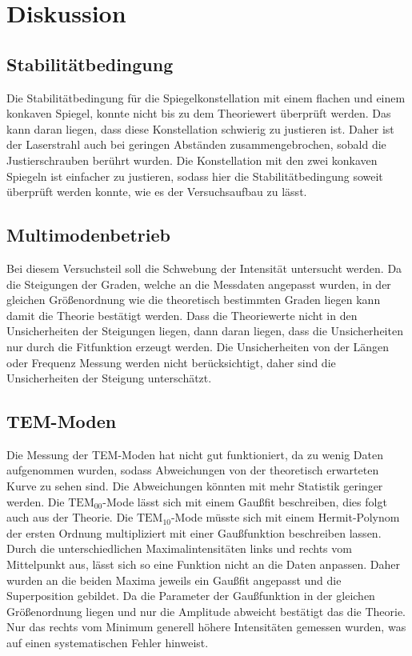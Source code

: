 \section{Diskussion}
\label{sec:Diskussion}
\subsection{Stabilitätbedingung}
Die Stabilitätbedingung für die Spiegelkonstellation mit einem flachen und einem konkaven Spiegel, konnte 
nicht bis zu dem Theoriewert überprüft werden. Das kann daran liegen, dass diese Konstellation schwierig zu 
justieren ist. Daher ist der Laserstrahl auch bei geringen Abständen zusammengebrochen, sobald die Justierschrauben 
berührt wurden. Die Konstellation mit den zwei konkaven Spiegeln ist einfacher zu justieren, sodass hier die Stabilitätbedingung
soweit überprüft werden konnte, wie es der Versuchsaufbau zu lässt.
\subsection{Multimodenbetrieb}
Bei diesem Versuchsteil soll die Schwebung der Intensität untersucht werden. Da die Steigungen der Graden, welche an die 
Messdaten angepasst wurden, in der gleichen Größenordnung wie die theoretisch bestimmten Graden liegen kann damit die 
Theorie bestätigt werden. Dass die Theoriewerte nicht in den Unsicherheiten der Steigungen liegen, dann daran liegen, dass
die Unsicherheiten nur durch die Fitfunktion erzeugt werden. Die Unsicherheiten von der Längen oder Frequenz Messung werden 
nicht berücksichtigt, daher sind die Unsicherheiten der Steigung unterschätzt.
\subsection{TEM-Moden}
Die Messung der TEM-Moden hat nicht gut funktioniert, da zu wenig Daten aufgenommen wurden, sodass Abweichungen 
von der theoretisch erwarteten Kurve zu sehen sind. Die Abweichungen könnten mit mehr Statistik geringer werden. 
Die $\text{TEM}_{00}$-Mode lässt sich mit einem Gaußfit beschreiben, dies folgt auch aus der Theorie. Die 
$\text{TEM}_{10}$-Mode müsste sich mit einem Hermit-Polynom der ersten Ordnung multipliziert mit einer Gaußfunktion 
beschreiben lassen. Durch die unterschiedlichen Maximalintensitäten links und rechts vom Mittelpunkt aus, lässt sich 
so eine Funktion nicht an die Daten anpassen. Daher wurden an die beiden Maxima jeweils ein Gaußfit angepasst und die 
Superposition gebildet. Da die Parameter der Gaußfunktion in der gleichen Größenordnung liegen und nur die Amplitude 
abweicht bestätigt das die Theorie. Nur das rechts vom Minimum generell höhere Intensitäten gemessen wurden, was auf einen systematischen
Fehler hinweist.
